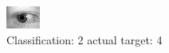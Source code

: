 \begin{figure}[h!]
\begin{center}
\includegraphics[width=0.60\columnwidth]{figures/ID801_class_2_target_4.png}
\end{center}
\caption{ Classification: 2 actual target: 4}
\label{fig:ID801_class_2_target_4}
\end{figure}
